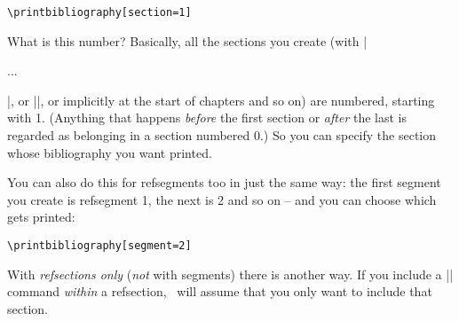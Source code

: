 \begin{verbatim}
\printbibliography[section=1]
\end{verbatim}

What is this number? Basically, all the sections you create (with
|\begin{refsection}...\end{refsection}|,
or |\newrefsection|, or implicitly at the start of chapters and so on) are
numbered, starting with 1. (Anything that happens \emph{before} the
first section or \emph{after} the last is regarded as belonging in a
section numbered 0.) So you can specify the section whose bibliography
you want printed.

You can also do this for refsegments too in just the same way: the first
segment you create is refsegment 1, the next is 2 and so on -- and you
can choose which gets printed:

\begin{verbatim}
\printbibliography[segment=2]
\end{verbatim}

With \emph{refsections only} (\emph{not} with segments) there is
another way. If you include a |\printbibliography| command \emph{within} a
refsection, \biblatex\ will assume that you only want to include that
section.

